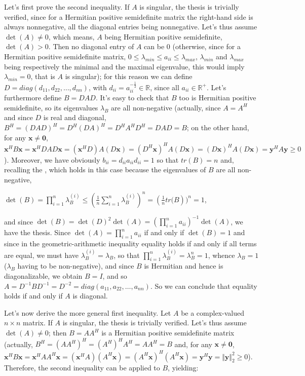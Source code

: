 \documentclass[12pt]{article}
\begin{document}
Let's first prove the second inequality. If $A$ is singular, the thesis is
trivially verified, since for a Hermitian positive semidefinite matrix the
right-hand side is always nonnegative, all the diagonal entries being nonnegative. Let's thus assume $\det (A)\neq 0$, which means, $A$ being
Hermitian positive semidefinite, $\det (A)>0$. Then no diagonal entry of $A$
can be $0$ (otherwise, since for a Hermitian positive semidefinite matrix, $0\leq \lambda_{min}\leq a_{ii}\leq \lambda _{max}$, $\lambda_{min}$ and $\lambda_{max}$ being respectively the minimal and the maximal eigenvalue, this would imply $\lambda_{min}=0$, that is $A$ is singular); for this reason we can define $D=diag(d_{11},d_{22},\ldots ,d_{nn})$, with $d_{ii}=a_{ii}^{-\frac{1}{2}}\in \mathbb{R}$, since all $a_{ii}\in \mathbb{R}^{+}$. Let's furthermore define $B=DAD$. It's easy to check that $B$ too is Hermitian positive semidefinite, so its eigenvalues $\lambda_{B}$ are all non-negative (actually, since $A=A^{H}$ and since $D$ is real and diagonal, $B^{H}=(DAD)^{H}=D^{H}(DA)^{H}=D^{H}A^{H}D^{H}=DAD=B$; on the other hand, for any $\mathbf{x}\neq \mathbf{0}$, $\mathbf{x}^{H}B\mathbf{x}=\mathbf{x}^{H}DAD\mathbf{x}=(\mathbf{x}^{H}D)A(D\mathbf{x})=(D^{H}\mathbf{x})^{H}A(D\mathbf{x})=(D\mathbf{x})^{H}A(D\mathbf{x})=\mathbf{y}^{H}A\mathbf{y}\geq 0$).
Moreover, we have obviously $b_{ii}=d_{ii}a_{ii}d_{ii}=1$ so that $tr(B)=n$
and, recalling the , which holds in this
case because the eigenvalues of $B$ are all non-negative,

$\det (B)=\prod_{i=1}^{n}\lambda _{B}^{(i)}\leq \left( \frac{1}{n}%
\sum_{i=1}^{n}\lambda _{B}^{(i)}\right) ^{n}=\left( \frac{1}{n}tr(B\right)
)^{n}=1$,

and since $\det (B)=\det (D)^{2}\det (A)=\left(\prod_{i=1}^{n}a_{ii}\right) ^{-1}\det (A)$, we have the thesis.
Since $\det (A)=\prod_{i=1}^{n}a_{ii}$ if and only if $\det
(B)=1$ and since in the geometric-arithmetic inequality equality holds if
and only if all terms are equal, we must have $\lambda _{B}^{(i)}=\lambda
_{B}$, so that $\prod_{i=1}^{n}\lambda _{B}^{(i)}=\lambda _{B}^{n}=1$,
whence $\lambda _{B}=1$ ($\lambda _{B}$ having to be non-negative), and since 
$B$ is Hermitian and hence is diagonalizable, we obtain $B=I$, and so $%
A=D^{-1}BD^{-1}=D^{-2}=diag(a_{11},a_{22},\ldots ,a_{nn})$. So we can
conclude that equality holds if and only if $A$ is diagonal.

Let's now derive the more general first inequality.
Let $A$ be a complex-valued $n\times n$ matrix. If $A$ is singular,
the thesis is trivially verified. Let's thus assume $\det (A)\neq 0$; then $B=AA^{H}$ is a Hermitian positive semidefinite matrix (actually, $B^{H}=(AA^{H})^{H}=(A^{H})^{H}A^{H}=AA^{H}=B$ and, for any $\mathbf{x}\neq\mathbf{0}$,$\mathbf{x}^{H}B\mathbf{x}=\mathbf{x}^{H}AA^{H}\mathbf{x}=(\mathbf{x}^{H}A)(A^{H}\mathbf{x})=(A^{H}\mathbf{x})^{H}(A^{H}\mathbf{x})=\mathbf{y}^{H}\mathbf{y}=\Vert \mathbf{y}\Vert _{2}^{2}\geq 0$). Therefore, the second inequality can be applied to $B$, yielding:
\end{document}
